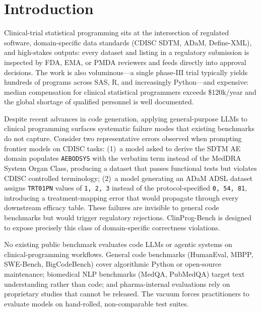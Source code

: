 \section{Introduction}
\label{sec:intro}

Clinical-trial statistical programming sits at the intersection of regulated
software, domain-specific data standards (CDISC SDTM, ADaM, Define-XML), and
high-stakes outputs: every dataset and listing in a regulatory submission is
inspected by FDA, EMA, or PMDA reviewers and feeds directly into approval
decisions. The work is also voluminous---a single phase-III trial typically
yields hundreds of programs across SAS, R, and increasingly Python---and
expensive: median compensation for clinical statistical programmers exceeds
\$120k/year and the global shortage of qualified personnel is well documented.

Despite recent advances in code generation, applying general-purpose LLMs to
clinical programming surfaces systematic failure modes that existing benchmarks
do not capture. Consider two representative errors observed when prompting
frontier models on CDISC tasks: (1)~a model asked to derive the SDTM AE domain
populates \texttt{AEBODSYS} with the verbatim term instead of the MedDRA
System Organ Class, producing a dataset that passes functional tests but
violates CDISC controlled terminology; (2)~a model generating an ADaM ADSL
dataset assigns \texttt{TRT01PN} values of \texttt{1, 2, 3} instead of the
protocol-specified \texttt{0, 54, 81}, introducing a treatment-mapping error
that would propagate through every downstream efficacy table. These failures
are invisible to general code benchmarks but would trigger regulatory
rejections. ClinProg-Bench is designed to expose precisely this class of
domain-specific correctness violations.

No existing public benchmark evaluates code LLMs or agentic systems on
clinical-programming workflows. General code benchmarks (HumanEval, MBPP,
SWE-Bench, BigCodeBench) cover algorithmic Python or open-source maintenance;
biomedical NLP benchmarks (MedQA, PubMedQA) target text understanding rather
than code; and pharma-internal evaluations rely on proprietary studies that
cannot be released. The vacuum forces practitioners to evaluate models on
hand-rolled, non-comparable test suites.

